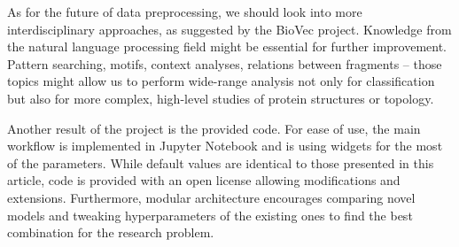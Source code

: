 \documentclass[12pt]{article}
\begin{document}
As for the future of data preprocessing, we should look into more interdisciplinary approaches, as suggested by the BioVec project. Knowledge from the natural language processing field might be essential for further improvement. Pattern searching, motifs, context analyses, relations between fragments -- those topics might allow us to perform wide-range analysis not only for classification but also for more complex, high-level studies of protein structures or topology.

Another result of the project is the provided code. For ease of use, the main workflow is implemented in Jupyter Notebook and is using widgets for the most of the parameters. While default values are identical to those presented in this article, code is provided with an open license allowing modifications and extensions. Furthermore, modular architecture encourages comparing novel models and tweaking hyperparameters of the existing ones to find the best combination for the research problem.
\end{document}

